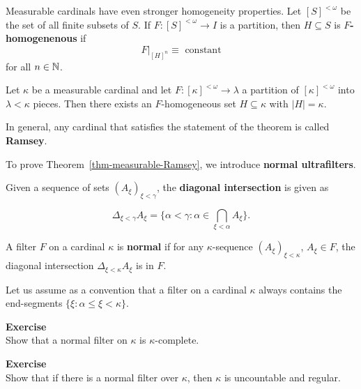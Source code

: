 Measurable cardinals have even stronger homogeneity properties. Let $[S]^{<\omega}$ be the set of all finite subsets of $S$. If $F: [S]^{<\omega} \to I$ is a partition, then $H \subseteq S$ is \textbf{$F$-homogenenous} if
\begin{equation*}
F|_{[H]^n} \equiv \text{ constant}
\end{equation*}
for all $n \in \mathbb{N}$.

\begin{theorem}[Rowbottom]\label{thm-measurable-ramsey}Let $\kappa$ be a measurable cardinal and let $F: [\kappa]^{<\omega} \to \lambda$ a partition of $[\kappa]^{<\omega}$ into $\lambda < \kappa$ pieces. Then there exists an $F$-homogeneous set $H \subseteq \kappa$ with $|H| = \kappa$.

\end{theorem}In general, any cardinal that satisfies the statement of the theorem is called \textbf{Ramsey}.

To prove Theorem~\ref{thm-measurable-Ramsey}, we introduce \textbf{normal ultrafilters}.

\begin{definition}\label{def-normal-filter}Given a sequence of sets $(A_\xi)_{\xi < \gamma}$, the \textbf{diagonal intersection} is given as

\begin{equation}
\Delta_{\xi < \gamma} A_\xi = \{ \alpha < \gamma \colon  \alpha \in \bigcap_{\xi < \alpha} A_\xi \}.
\end{equation}

A filter $F$ on a cardinal $\kappa$ is \textbf{normal} if for any $\kappa$-sequence $(A_\xi)_{\xi < \kappa}$, $A_\xi \in F$, the diagonal intersection $\Delta_{\xi < \kappa} A_\xi$ is in $F$.

\end{definition}Let us assume as a convention that a filter on a cardinal $\kappa$ always contains the end-segments $\{\xi \colon \alpha \leq \xi < \kappa\}$.

\begin{framed}
\textbf{Exercise}\\
Show that a normal filter on $\kappa$ is $\kappa$-complete.
\end{framed}

\begin{framed}
\textbf{Exercise}\\
Show that if there is a normal filter over $\kappa$, then $\kappa$ is uncountable and regular.
\end{framed}

